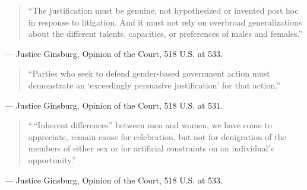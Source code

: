 \documentclass[12pt]{article}
\begin{document}
\begin{quote}
``The justification must be genuine, not hypothesized or invented post hoc in response to litigation. And it must not rely on overbroad generalizations about the different talents, capacities, or preferences of males and females.''
\end{quote}
\noindent --- Justice Ginsburg, Opinion of the Court, 518 U.S. at 533.

\begin{quote}
``Parties who seek to defend gender-based government action must demonstrate an `exceedingly persuasive justification' for that action.''
\end{quote}
\noindent --- Justice Ginsburg, Opinion of the Court, 518 U.S. at 531.

\begin{quote}
``\,``Inherent differences'' between men and women, we have come to appreciate, remain cause for celebration, but not for denigration of the members of either sex or for artificial constraints on an individual's opportunity.''
\end{quote}
\noindent --- Justice Ginsburg, Opinion of the Court, 518 U.S. at 533.
\end{document}
